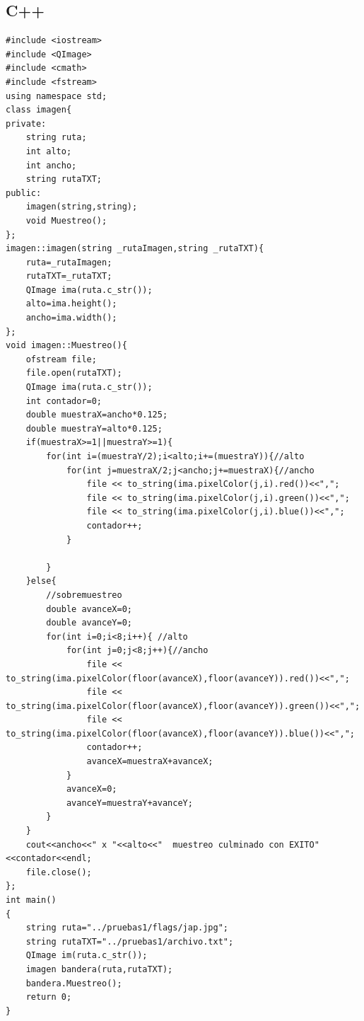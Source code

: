 \documentclass{article}
\begin{document}
\subsection{C++}
\begin{lstlisting}
#include <iostream>
#include <QImage>
#include <cmath>
#include <fstream>
using namespace std;
class imagen{
private:
    string ruta;
    int alto;
    int ancho;
    string rutaTXT;
public:
    imagen(string,string);
    void Muestreo();
};
imagen::imagen(string _rutaImagen,string _rutaTXT){
    ruta=_rutaImagen;
    rutaTXT=_rutaTXT;
    QImage ima(ruta.c_str());
    alto=ima.height();
    ancho=ima.width();
};
void imagen::Muestreo(){
    ofstream file;
    file.open(rutaTXT);
    QImage ima(ruta.c_str());
    int contador=0;
    double muestraX=ancho*0.125;
    double muestraY=alto*0.125;
    if(muestraX>=1||muestraY>=1){
        for(int i=(muestraY/2);i<alto;i+=(muestraY)){//alto
            for(int j=muestraX/2;j<ancho;j+=muestraX){//ancho
                file << to_string(ima.pixelColor(j,i).red())<<",";
                file << to_string(ima.pixelColor(j,i).green())<<",";
                file << to_string(ima.pixelColor(j,i).blue())<<",";
                contador++;
            }

        }
    }else{
        //sobremuestreo
        double avanceX=0;
        double avanceY=0;
        for(int i=0;i<8;i++){ //alto
            for(int j=0;j<8;j++){//ancho
                file << to_string(ima.pixelColor(floor(avanceX),floor(avanceY)).red())<<",";
                file << to_string(ima.pixelColor(floor(avanceX),floor(avanceY)).green())<<",";
                file << to_string(ima.pixelColor(floor(avanceX),floor(avanceY)).blue())<<",";
                contador++;
                avanceX=muestraX+avanceX;
            }
            avanceX=0;
            avanceY=muestraY+avanceY;
        }
    }
    cout<<ancho<<" x "<<alto<<"  muestreo culminado con EXITO"<<contador<<endl;
    file.close();
};
int main()
{
    string ruta="../pruebas1/flags/jap.jpg";
    string rutaTXT="../pruebas1/archivo.txt";
    QImage im(ruta.c_str());
    imagen bandera(ruta,rutaTXT);
    bandera.Muestreo();
    return 0;
}
\end{lstlisting}
\end{document}
